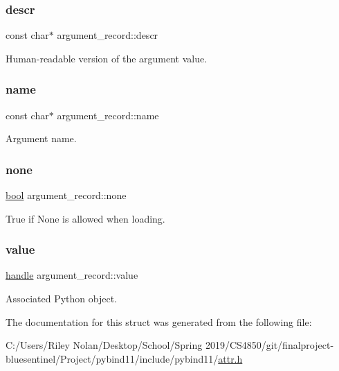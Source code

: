 \subsubsection{\texorpdfstring{descr}{descr}}
{\footnotesize\ttfamily const char$\ast$ argument\+\_\+record\+::descr}



Human-\/readable version of the argument value. 

\mbox{\label{structargument__record_ac9bb5bf320b8eb1de1ef5f9dcc808269}} 
\subsubsection{\texorpdfstring{name}{name}}
{\footnotesize\ttfamily const char$\ast$ argument\+\_\+record\+::name}



Argument name. 

\mbox{\label{structargument__record_a62c9d868218688cd4abde4634646848c}} 
\subsubsection{\texorpdfstring{none}{none}}
{\footnotesize\ttfamily \mbox{\hyperlink{asdl_8h_af6a258d8f3ee5206d682d799316314b1}{bool}} argument\+\_\+record\+::none}



True if None is allowed when loading. 

\mbox{\label{structargument__record_a3d6ba6a0cb59834720cb7d7df5bdb2c2}} 
\subsubsection{\texorpdfstring{value}{value}}
{\footnotesize\ttfamily \mbox{\hyperlink{classhandle}{handle}} argument\+\_\+record\+::value}



Associated Python object. 



The documentation for this struct was generated from the following file\+:\begin{DoxyCompactItemize}
\item 
C\+:/\+Users/\+Riley Nolan/\+Desktop/\+School/\+Spring 2019/\+C\+S4850/git/finalproject-\/bluesentinel/\+Project/pybind11/include/pybind11/\mbox{\hyperlink{attr_8h}{attr.\+h}}\end{DoxyCompactItemize}
